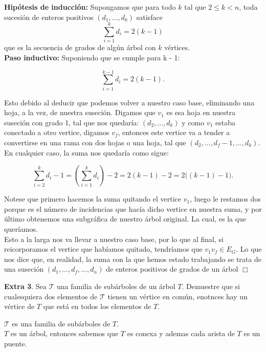 \documentclass[12pt]{article}
\begin{document}
\textbf{Hipótesis de inducción:} Supongamos que para todo $k$ tal que $2 \le k < n$, toda sucesión de enteros 
positivos $(d_1,\dots,d_k)$ satisface
\[
\sum_{i=1}^k d_i = 2(k-1)
\]
que es la secuencia de grados de algún árbol con $k$ vértices.\\

\textbf{Paso inductivo: } Suponiendo que se cumple para k - 1: 

\[
\sum_{i=1}^{k-1} d_i = 2(k-1).
\]

Esto debido al deducir que podemos volver a nuestro caso base, eliminando una hoja, a la vez, de nuestra suseción. Digamos que $v_1$ 
es esa hoja en nuestra suseción con grado 1, tal que nos quedaría: $(d_2,\dots,d_k)$ y como $v_1$ estaba conectado a otro vertice, 
digamos $v_f$, entonces este vertice va a tender a convertirse en una rama con dos hojas o una hoja, tal que $(d_2,\dots,d_f - 1,\dots,d_k)$.\\

En cualquier caso, la suma nos quedaría como sigue: 

\[
\sum_{i=2}^k d_i - 1 = \left(\sum_{i=1}^k d_i\right) - 2 = 2(k-1) - 2 = 2\bigl((k-1)-1\bigr).
\]


Notese que primero hacemos la suma quitando el vertice $v_1$, luego le restamos dos porque es el número de incidencias 
que hacía dicho vertice en nuestra suma, y por último obtenemos una subgráfica de nuestro árbol original. La cual, es la que queríamos.\\ 

Esto a la larga nos va llevar a nuestro caso base, por lo que al final, si reicorporamos el vertice que 
habíamos quitado, tendríamos que $v_1v_f \in E_G$. Lo que nos dice que, en realidad, la suma con la que hemos estado 
trabajando se trata de una suseción $(d_1,\dots,d_f,\dots,d_n)$ de enteros positivos de grados de un árbol
\hfill $\Box$


\vspace{1cm}

%
%
\textbf{Extra 3}. Sea $\mathcal{T}$ una familia de subárboles de un árbol $T$. Demuestre que si cualesquiera dos elementos de $\mathcal{T}$
tienen un vértice en común, enotnces hay un vértice de $T$ que está en todos los elementos de $T$.

\begin{tcolorbox}[title=\textbf{Hipotesis}, colback=red!15!white, colframe=black!, breakable]
	$\mathcal{T}$ es una familia de subárboles de $T$.\\

    $T$ es un árbol, entonces sabemos que $T$ es conexa y ademas cada arista de $T$ es un puente.
\end{tcolorbox}
\end{document}
